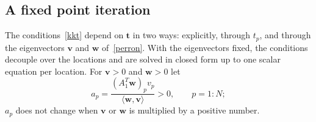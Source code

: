 \documentclass[11pt]{article}
\theoremstyle{plain}
\theoremstyle{definition}
\theoremstyle{remark}
\numberwithin{equation}{section}
\numberwithin{figure}{section}
\numberwithin{table}{section}
\numberwithin{algorithm}{section}
\begin{document}
\subsection{A fixed point iteration}\label{sec-fixed-point}

The conditions~\eqref{kkt} depend on $\bm t$ in two ways: explicitly, through
$t_p$, and through the eigenvectors $\bm v$ and $\bm w$ of~\eqref{perron}.
With the eigenvectors fixed, the conditions decouple over the locations and
are solved in closed form up to one scalar equation per location. For
$\bm v>0$ and $\bm w>0$ let
\begin{equation}\label{a-p}
a_p=\frac{\left(A_1^T\bm w\right)_pv_p}{\langle\bm w,\bm v\rangle}>0,
\qquad p=1:N ;
\end{equation}
$a_p$ does not change when $\bm v$ or $\bm w$ is multiplied by a positive
number.
\end{document}
